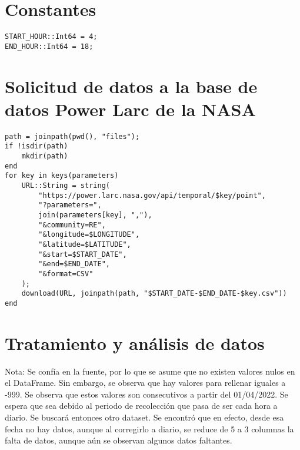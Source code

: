 \section*{Constantes}

\begin{lstlisting}
START_HOUR::Int64 = 4;
END_HOUR::Int64 = 18;
\end{lstlisting}

\section*{Solicitud de datos a la base de datos Power Larc de la NASA}

\begin{lstlisting}
path = joinpath(pwd(), "files");
if !isdir(path)
	mkdir(path)
end
for key in keys(parameters)
	URL::String = string(
		"https://power.larc.nasa.gov/api/temporal/$key/point",
		"?parameters=",
		join(parameters[key], ","),
		"&community=RE",
		"&longitude=$LONGITUDE",
		"&latitude=$LATITUDE",
		"&start=$START_DATE",
		"&end=$END_DATE",
		"&format=CSV"
	);
	download(URL, joinpath(path, "$START_DATE-$END_DATE-$key.csv"))
end
\end{lstlisting}

\section*{Tratamiento y análisis de datos}

Nota: Se confía en la fuente, por lo que se asume que no existen valores nulos en el DataFrame. Sin embargo, se observa que hay valores para rellenar iguales a -999. Se observa que estos valores son consecutivos a partir del 01/04/2022. Se espera que sea debido al periodo de recolección que pasa de ser cada hora a diario. Se buscará entonces otro dataset. Se encontró que en efecto, desde esa fecha no hay datos, aunque al corregirlo a diario, se reduce de 5 a 3 columnas la falta de datos, aunque aún se observan algunos datos faltantes.

